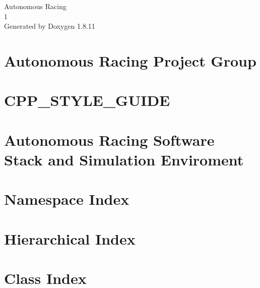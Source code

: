 \documentclass[twoside]{book}
\newcommand{\+}{\discretionary{\mbox{\scriptsize$\hookleftarrow$}}{}{}}
\newcommand{\clearemptydoublepage}{%
  \newpage{\pagestyle{empty}\cleardoublepage}%
}
\begin{document}
\hypersetup{pageanchor=false,
             bookmarksnumbered=true,
             pdfencoding=unicode
            }
\begin{titlepage}
\vspace*{7cm}
\begin{center}%
{\Large Autonomous Racing \\[1ex]\large 1 }\\
\vspace*{1cm}
{\large Generated by Doxygen 1.8.11}\\
\end{center}
\end{titlepage}
\clearemptydoublepage
\tableofcontents
\clearemptydoublepage
{}
\hypersetup{pageanchor=true}

\chapter{Autonomous Racing Project Group}
\label{index}\hypertarget{index}{}
\chapter{C\+P\+P\+\_\+\+S\+T\+Y\+L\+E\+\_\+\+G\+U\+I\+DE}
\label{md__home_travis_build_Autonomous-Racing-PG_ar-tu-do_docs_master_CPP_STYLE_GUIDE}
\hypertarget{md__home_travis_build_Autonomous-Racing-PG_ar-tu-do_docs_master_CPP_STYLE_GUIDE}{}

\chapter{Autonomous Racing Software Stack and Simulation Enviroment}
\label{md__home_travis_build_Autonomous-Racing-PG_ar-tu-do_docs_master_README}
\hypertarget{md__home_travis_build_Autonomous-Racing-PG_ar-tu-do_docs_master_README}{}

\chapter{Namespace Index}

\chapter{Hierarchical Index}

\chapter{Class Index}

\end{document}
